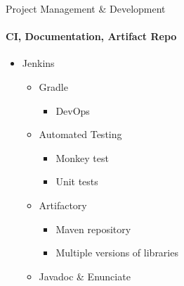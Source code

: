 \begin{frame}[t]{Project Management \& Development}\framesubtitle{CI, Documentation, Artifact Repo}
    \begin{itemize}
        \item Jenkins
        \begin{itemize}
            \item Gradle
            \begin{itemize}
                \item DevOps
            \end{itemize}
            \item Automated Testing
            \begin{itemize}
                \item Monkey test
                \item Unit tests
            \end{itemize}
            \item Artifactory
            \begin{itemize}
                \item Maven repository
                \item Multiple versions of libraries
            \end{itemize}
            \item Javadoc \& Enunciate
        \end{itemize}
    \end{itemize}
\end{frame}
